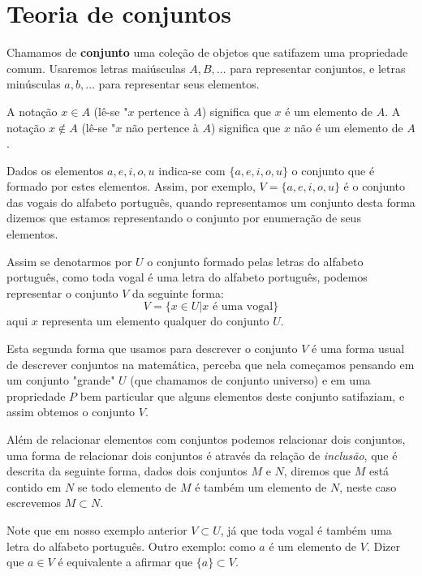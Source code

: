 \chapter{Teoria de conjuntos}


Chamamos de \textbf{conjunto} uma coleção de objetos que satifazem uma propriedade comum. Usaremos letras maiúsculas $A, B, \ldots$ para representar  conjuntos, e letras minúsculas $a, b, \ldots$ para representar seus elementos.

A notação $x \in A$ (lê-se "$x$ pertence à $A$) significa que $x$ é um elemento de $A$. A notação $x \notin A$ (lê-se "$x$ não pertence à $A$) significa que $x$ não é um elemento de $A$.

Dados os elementos $a, e, i, o, u$ indica-se com $\{a, e, i, o, u\}$ o conjunto que é formado por estes elementos. Assim, por exemplo, $V= \{a, e, i, o, u\}$ é o conjunto das vogais do alfabeto português, quando representamos um conjunto desta forma dizemos que estamos representando o conjunto por enumeração de seus elementos.

Assim se denotarmos por $U$ o conjunto formado pelas letras do alfabeto português, como toda vogal é uma letra do alfabeto português, podemos representar o conjunto $V$ da seguinte forma:
\[V= \{x \in U | x \text{ é uma vogal}\}\]
aqui $x$ representa um elemento qualquer do conjunto $U$.

Esta segunda forma que usamos para descrever o conjunto $V$ é uma forma usual de descrever conjuntos na matemática, perceba que nela começamos pensando em um conjunto "grande" $U$ (que chamamos de conjunto universo) e em uma propriedade $P$ bem particular que alguns elementos deste conjunto satifaziam, e assim obtemos o conjunto $V$.

Além de relacionar elementos com conjuntos podemos relacionar dois conjuntos, uma forma de relacionar dois conjuntos é através da relação de \textit{inclusão}, que é descrita da seguinte forma, dados dois conjuntos $M$ e $N$, diremos que $M$ está contido em $N$ se todo elemento de $M$ é também um elemento de $N$, neste caso escrevemos $M \subset N$.

Note que em nosso exemplo anterior $V \subset U$, já que toda vogal é também uma letra do alfabeto português. Outro exemplo: como $a$ é um elemento de $V$. Dizer que $a \in V$ é equivalente a afirmar que $\{a\} \subset V$.

\vskip0.4cm

